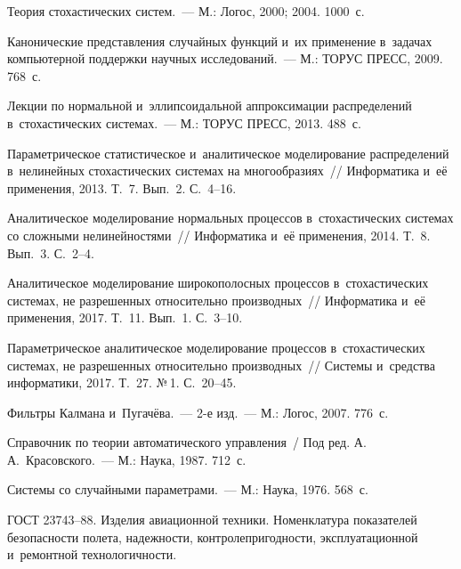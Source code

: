 \begin{multicols}{2}
{{\begin{thebibliography}{99}
Теория стохастических систем.~--- М.: Логос, 2000; 2004. 1000~с.

Канонические представления случайных функций и~их применение 
в~задачах компьютерной поддержки научных исследований.~--- М.: ТОРУС
ПРЕСС, 2009. 768~с.

Лекции по нормальной и~эллипсоидальной аппроксимации распределений 
в~стохастических системах.~--- М.: ТОРУС ПРЕСС, 2013. 488~с.

Параметрическое статистическое и~аналитическое моделирование распределений в~нелинейных 
стохастических системах на многообразиях~// Информатика и~её применения, 2013. Т.~7. Вып.~2. С.~4--16.

Аналитическое моделирование нормальных процессов в~стохастических системах со сложными нелинейностями~// 
Информатика и~её применения, 2014. Т.~8. Вып.~3. С.~2--4.

Аналитическое моделирование широкополосных процессов в~стохастических системах, 
не разрешенных относительно производных~// Информатика и~её применения, 2017. Т.~11. Вып.~1. С.~3--10.

Параметрическое аналитическое моделирование процессов в~стохастических  сис\-те\-мах, 
не разрешенных относительно производных~// Сис\-те\-мы и~средства информатики, 2017. Т.~27. №\,1. С.~20--45.


Фильтры Калмана и~Пугачёва.~--- 2-е изд.~--- М.: Логос, 2007. 776~с.


Справочник по теории автоматического управления~/ Под ред. А.\,А.~Красовского.~--- М.: Наука, 1987. 712~с.

Системы со случайными параметрами.~--- М.: Наука, 1976. 568~с.

ГОСТ 23743--88. Изделия авиационной техники. Номенклатура показателей безопасности полета, 
надежности, контролепригодности, эксплуатационной и~ремонтной технологичности.


\end{thebibliography}}}
\end{multicols}
